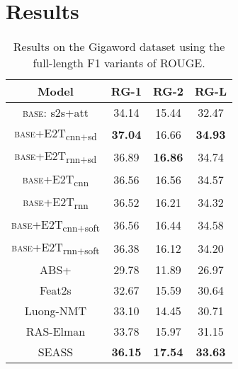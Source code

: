 \documentclass[11pt,a4paper]{article}
\begin{document}
\section{Results}

\begin{table}[t]
\centering
    \begin{tabular}{|c|ccc|}
    \hline
    Model & RG-1    & RG-2    & RG-L \\
    \hline
    \hline
    \textsc{base}: s2s+att & 34.14 & 15.44 & 32.47 \\
    \hline
    \textsc{base}+E2T\textsubscript{cnn+sd} & \textbf{37.04} & 16.66 & \textbf{34.93} \\
    \textsc{base}+E2T\textsubscript{rnn+sd} & 36.89 & \textbf{16.86} & 34.74 \\
    \hline
    \textsc{base}+E2T\textsubscript{cnn} & 36.56 & 16.56 & 34.57 \\
    \textsc{base}+E2T\textsubscript{rnn} & 36.52 & 16.21 & 34.32 \\
    \textsc{base}+E2T\textsubscript{cnn+soft} & 36.56 & 16.44 & 34.58 \\
    \textsc{base}+E2T\textsubscript{rnn+soft} & 36.38 & 16.12 & 34.20 \\
    \hline
    \hline
    ABS+ & 29.78 & 11.89 & 26.97 \\
    Feat2s & 32.67 & 15.59 & 30.64 \\
    Luong-NMT & 33.10 & 14.45 & 30.71 \\
    RAS-Elman & 33.78 & 15.97 & 31.15 \\
    SEASS & \textbf{36.15} & \textbf{17.54} & \textbf{33.63} \\
    \hline
    \end{tabular}\caption{Results on the Gigaword dataset using the full-length F1 variants of ROUGE. 
}
  \label{tab:resgiga}\end{table}
\end{document}
